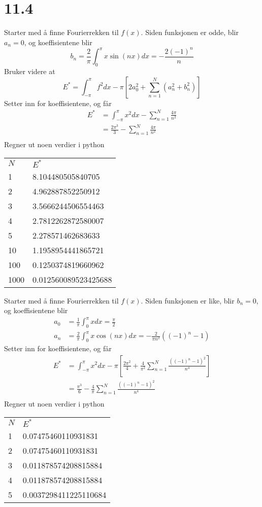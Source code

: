 \documentclass[11pt, a4paper, norsk]{NTNUoving}
\begin{document}
\section*{11.4}
\begin{oppgave}[2]
Starter med å finne Fourierrekken til $f(x)$. Siden funksjonen er odde, blir $a_n=0$, og koeffisientene blir
\[
b_n=\frac{2}{\pi}\int_0^{\pi}x\sin(nx) dx = -\frac{2(-1)^n}{n}	
\]
Bruker videre at
\[
E^{*} = \int_{-\pi}^{\pi}f^2 dx - \pi \left[2a_0^2 + \sum_{n=1}^{N} (a_n^2+b_n^2)\right]
\]
Setter inn for koeffisientene, og får
\begin{align*}
E^{*} &= \int_{-\pi}^{\pi}x^2 dx - \sum_{n=1}^{N}\frac{4\pi}{n^2} \\
	&= \frac{2\pi^3}{3}-  \sum_{n=1}^{N}\frac{4\pi}{n^2} \\
\end{align*}
Regner ut noen verdier i python
\begin{center}
\begin{tabular}{ll}
$N$ & $E^{*}$\\
1& 8.104480505840705\\
2& 4.962887852250912\\
3& 3.5666244506554463\\
4& 2.7812262872580007\\
5& 2.278571462683633\\
10& 1.1958954441865721\\
100& 0.1250374819660962\\
1000& 0.012560089523425688 \\
\end{tabular}
\end{center}
\end{oppgave}
\begin{oppgave}[3]
Starter med å finne Fourierrekken til $f(x)$. Siden funksjonen er like, blir $b_n=0$, og koeffisientene blir
\begin{align*}
a_0 &= \frac{1}{\pi}\int_0^{\pi}x dx = \frac{\pi}{2}\\
a_n&=\frac{2}{\pi}\int_0^{\pi}x\cos(nx) dx = -\frac{2}{\pi n^2}((-1)^n-1)	
\end{align*}
Setter inn for koeffisientene, og får
\begin{align*}
E^{*} &= \int_{-\pi}^{\pi}x^2 dx - \pi \left[\frac{2\pi^2}{4} + \frac{4}{\pi^2}\sum_{n=1}^{N} \frac{((-1)^n-1)^2}{n^4}\right] \\
 &=\frac{\pi^3}{6} - \frac{4}{\pi}\sum_{n=1}^{N} \frac{((-1)^n-1)^2}{n^4} \\
\end{align*}
Regner ut noen verdier i python
\begin{center}
\begin{tabular}{ll}
$N$ & $E^{*}$\\
1& 0.07475460110931831 \\
2& 0.07475460110931831 \\
3& 0.011878574208815884 \\
4& 0.011878574208815884 \\
5& 0.0037298411225110684 \\
\end{tabular}
\end{center}
\end{oppgave}
\end{document}
